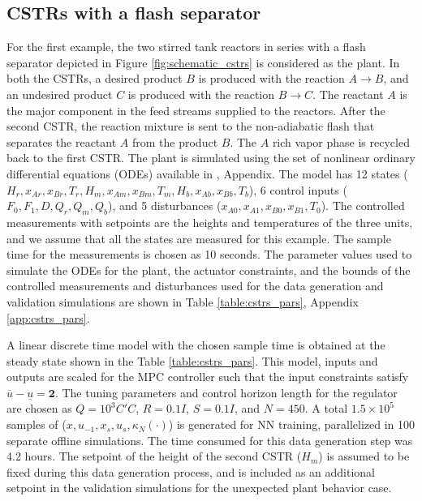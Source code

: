 \documentclass[preprint,5p, twocolumn, authoryear]{elsarticle}
\begin{document}
\subsection{CSTRs with a flash separator}
For the first example, the two stirred tank reactors in series with a flash
separator depicted in Figure \ref{fig:schematic_cstrs} is considered as the
plant. In both the CSTRs, a desired product $B$ is produced with the reaction $A
\rightarrow B$, and an undesired product $C$ is produced with the reaction $B
\rightarrow C$. The reactant $A$ is the major component in the feed streams
supplied to the reactors. After the second CSTR, the reaction mixture is sent to
the non-adiabatic flash that separates the reactant $A$ from the product $B$.
The $A$ rich vapor phase is recycled back to the first CSTR. The plant is
simulated using the set of nonlinear ordinary differential equations (ODEs)
available in \cite*{venkat:2006}, Appendix. The model has 12 states ($H_r,
x_{Ar}, x_{Br}, T_r, H_m, x_{Am}, x_{Bm}, T_m, H_b, x_{Ab}, x_{Bb}, T_b$), 6
control inputs ($F_0, F_1, D, Q_r, Q_m, Q_b$), and 5 disturbances ($x_{A0},
x_{A1}, x_{B0}, x_{B1}, T_0$). The controlled measurements with setpoints are
the heights and temperatures of the three units, and we assume that all the
states are measured for this example. The sample time for the measurements is
chosen as 10 seconds. The parameter values used to simulate the ODEs for the
plant, the actuator constraints, and the bounds of the controlled measurements
and disturbances used for the data generation and validation simulations are
shown in Table \ref{table:cstrs_pars}, Appendix \ref{app:cstrs_pars}.

A linear discrete time model with the chosen sample time is obtained at the
steady state shown in the Table \ref{table:cstrs_pars}. This model, inputs and
outputs are scaled for the MPC controller such that the input constraints
satisfy $\overline{u} - \underline{u} = \mathbf{2}$. The tuning parameters and
control horizon length for the regulator are chosen as $Q = 10^3 C'C$, $R = 0.1
I$, $S = 0.1 I$, and $N = 450$. A total $1.5 \times 10^5$ samples of ($x,
u_{-1}, x_s, u_s, \kappa_N(\cdot)$) is generated for NN training, parallelized
in 100 separate offline simulations. The time consumed for this data generation
step was 4.2 hours. The setpoint of the height of the second CSTR ($H_m$) is
assumed to be fixed during this data generation process, and is included as an
additional setpoint in the validation simulations for the unexpected plant
behavior case.
\end{document}
